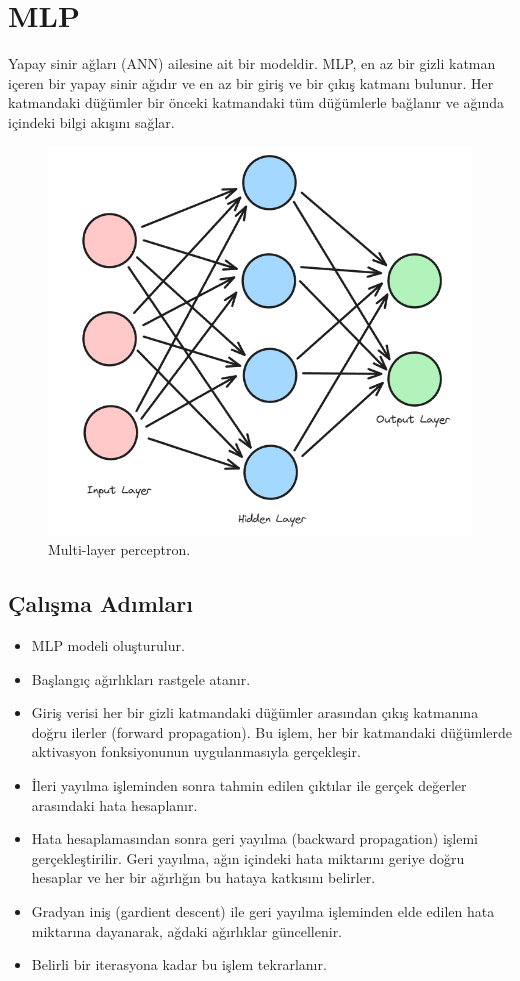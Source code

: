 \section{MLP}
Yapay sinir ağları (ANN) ailesine ait bir modeldir. MLP, en az bir gizli katman içeren bir yapay sinir ağıdır ve en az bir giriş ve bir çıkış katmanı bulunur. Her katmandaki düğümler bir önceki katmandaki tüm düğümlerle bağlanır ve ağında içindeki bilgi akışını sağlar.

\begin{figure}[h]
    \centering
    \includegraphics[width=1\textwidth]{images/mlp.png}
    \caption{Multi-layer perceptron.}
    \label{fig:enter-label}
\end{figure}

\subsection{Çalışma Adımları}
\begin{itemize}
    \item MLP modeli oluşturulur.
    \item Başlangıç ağırlıkları rastgele atanır.
    \item Giriş verisi her bir gizli katmandaki düğümler arasından çıkış katmanına doğru ilerler (forward propagation). Bu işlem, her bir katmandaki düğümlerde aktivasyon fonksiyonunun uygulanmasıyla gerçekleşir.
    \item İleri yayılma işleminden sonra tahmin edilen çıktılar ile gerçek değerler arasındaki hata hesaplanır.
    \item Hata hesaplamasından sonra geri yayılma (backward propagation) işlemi gerçekleştirilir. Geri yayılma, ağın içindeki hata miktarını geriye doğru hesaplar ve her bir ağırlığın bu hataya katkısını belirler.
    \item Gradyan iniş (gardient descent) ile geri yayılma işleminden elde edilen hata miktarına dayanarak, ağdaki ağırlıklar güncellenir.
    \item Belirli bir iterasyona kadar bu işlem tekrarlanır.
\end{itemize}

